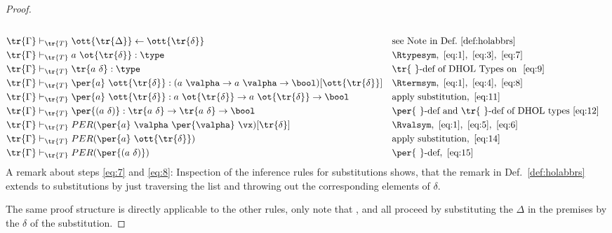 \begin{proof}
\begin{align}
                                                                       \label{eq:7}\\
    \tr{\Gamma} &\vdash_{\tr{T}} \ott{\tr{\Delta}} \leftarrow \ott{\tr{\delta}} && \text{see Note in
                                                                       Def.}~\ref{def:holabbrs}
                                                                       \label{eq:8}\\
    \tr{\Gamma} &\vdash_{\tr{T}} a\ \ot{\tr{\delta}}:\type && \text{\Rtypesym},~\ref{eq:1},~\ref{eq:3},~\ref{eq:7} \label{eq:9}\\
    \tr{\Gamma} &\vdash_{\tr{T}} \tr{a\ \delta}:\type && \tr{\phantom{t}}\text{-def of DHOL
                                                         Types on }~\ref{eq:9} \label{eq:10}\\
    \tr{\Gamma} &\vdash_{\tr{T}} \per{a}\ \ott{\tr{\delta}} : (a\ \valpha\to a\ \valpha\to \bool)[\ott{\tr{\delta}}] &&
                                                                                                                        \text{\Rtermsym},~\ref{eq:1},~\ref{eq:4},~\ref{eq:8} \label{eq:11}\\
    \tr{\Gamma} &\vdash_{\tr{T}} \per{a}\ \ott{\tr{\delta}} : a\ \ot{\tr{\delta}}\to a\
                  \ot{\tr{\delta}}\to\bool && \text{apply substitution},~\ref{eq:11} \label{eq:12}\\
    \tr{\Gamma} &\vdash_{\tr{T}} \per{(a\ \delta)} : \tr{a\ \delta}\to \tr{a\ \delta}\to\bool
                        && \per{\phantom{t}}\text{-def and } \tr{\phantom{t}}\text{-def of DHOL
    types}~\ref{eq:12} \label{eq:13}\\
    \tr{\Gamma} &\vdash_{\tr{T}} PER(\per{a}\ \valpha\ \per{\valpha}\ \vx)[\tr{\delta}] &&
                                                                                         \text{\Rvalsym},~\ref{eq:1},~\ref{eq:5},~\ref{eq:6} \label{eq:14}\\
    \tr{\Gamma} &\vdash_{\tr{T}} PER(\per{a}\ \ott{\tr{\delta}}) && \text{apply
                                                                    substitution},~\ref{eq:14} \label{eq:15}\\
    \tr{\Gamma} &\vdash_{\tr{T}} PER(\per{(a\ \delta)}) && \per{\phantom{t}}\text{-def},~\ref{eq:15}
  \end{align}
  A remark about steps \ref{eq:7} and \ref{eq:8}: Inspection of the inference rules for
  substitutions shows, that the remark in Def.~\ref{def:holabbrs} extends to substitutions by
  just traversing the list and throwing out the corresponding elements of \(\delta\).

The same proof structure is directly applicable to the other rules, only note that \Rtypesym, \Rtermsym and \Rvalsym all proceed by
  substituting the \(\Delta\) in the premises by the \(\delta\) of the substitution.
\end{proof}

